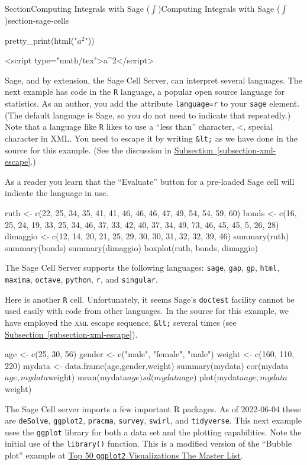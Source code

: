 \documentclass[twoside,10pt,]{article}
\newcommand{\xreffont}{\relax}
\newcommand{\mono}[1]{\texttt{#1}}
\newcommand{\initialism}[1]{\textsc{\MakeLowercase{#1}}}
\numberwithin{equation}{section}
\begin{document}
\begin{sectionptx}{Section}{Computing Integrals with Sage (\(\int\))}{}{Computing Integrals with Sage (\(\int\))}{}{}{section-sage-cells}
\begin{sageinput}
pretty_print(html("$a^2$"))
\end{sageinput}
\begin{sageoutput}
<script type="math/tex">a^2</script>
\end{sageoutput}
Sage, and by extension, the Sage Cell Server, can interpret several languages.  The next example has code in the \mono{R} language, a popular open source language for statistics.  As an author, you add the attribute \mono{language=\textquotedbl{}r\textquotedbl{}} to your \mono{sage} element.  (The default language is Sage, so you do not need to indicate that repeatedly.)  Note that a language like \mono{R} likes to use a ``less than'' character, \textless{}, special character in XML.  You need to escape it by writing \mono{\&lt;} as we have done in the source for this example.  (See the discussion in \hyperref[subsection-xml-escape]{Subsection~{\xreffont\ref{subsection-xml-escape}}}.)%
\par
As a reader you learn that the ``Evaluate'' button for a pre-loaded Sage cell will indicate the language in use.%
\begin{sageinput}
ruth <- c(22, 25, 34, 35, 41, 41, 46, 46, 46, 47, 49, 54, 54, 59, 60)
bonds <- c(16, 25, 24, 19, 33, 25, 34, 46, 37, 33, 42, 40, 37, 34, 49, 73, 46, 45, 45, 5, 26, 28)
dimaggio <- c(12, 14, 20, 21, 25, 29, 30, 30, 31, 32, 32, 39, 46)
summary(ruth)
summary(bonds)
summary(dimaggio)
boxplot(ruth, bonds, dimaggio)
\end{sageinput}
The Sage Cell Server supports the following languages:  \mono{sage}, \mono{gap}, \mono{gp}, \mono{html}, \mono{maxima}, \mono{octave}, \mono{python}, \mono{r}, and \mono{singular}.%
\par
Here is another \mono{R} cell.  Unfortunately, it seems Sage's \mono{doctest} facility cannot be used easily with code from other languages.  In the source for this example, we have employed the \initialism{XML} escape sequence, \mono{\&lt;} several times (see \hyperref[subsection-xml-escape]{Subsection~{\xreffont\ref{subsection-xml-escape}}}).%
\begin{sageinput}
age <- c(25, 30, 56)
gender <- c("male", "female", "male")
weight <- c(160, 110, 220)
mydata <- data.frame(age,gender,weight)
summary(mydata)
cor(mydata$age,mydata$weight)
mean(mydata$age)
sd(mydata$age)
plot(mydata$age,mydata$weight)
\end{sageinput}
The Sage Cell server imports a few important R packages.  As of 2022-06-04 these are \mono{deSolve}, \mono{ggplot2}, \mono{pracma}, \mono{survey}, \mono{swirl}, and \mono{tidyverse}.  This next example uses the \mono{ggplot} library for both a data set and the plotting capabilities.  Note the initial use of the \mono{library()} function.  This is a modified version of the ``Bubble plot'' example at \href{http://r-statistics.co/Top50-Ggplot2-Visualizations-MasterList-R-Code.html}{Top 50 \mono{ggplot2} Visualizations \textemdash{}The Master List}.%

\end{sectionptx}
\end{document}
